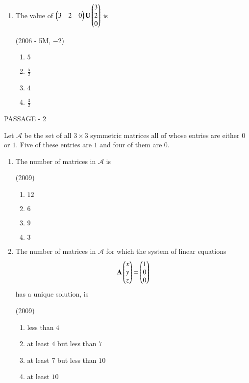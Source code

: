 \documentclass[journal,12pt,twocolumn]{IEEEtran}
\theoremstyle{remark}
\begin{document}
\begin{multicols}{2}
\begin{enumerate}
		\item The value of $\begin{pmatrix} 3 & 2 & 0 \end{pmatrix}
				\mathbf{U}
				\begin{pmatrix} 3 \\ 2 \\ 0 \end{pmatrix}$ is

			\hfill(2006 - 5M, $-2$)
			\begin{enumerate}
				\item $5$
				\item $\frac{5}{2}$
				\item $4$
				\item $\frac{3}{2}$
			\end{enumerate}
	\end{enumerate}

	\bigskip

	{\centering PASSAGE - 2 \par}

	\bigskip

	Let $\mathcal{A}$ be the set of all $3\times3$ symmetric matrices all of whose entries are either $0$ or $1$. Five of these entries are $1$ and four of them are $0$.

	\begin{enumerate}
		\item The number of matrices in $\mathcal{A}$ is

			\hfill(2009)

			\begin{enumerate}
				\item $12$
				\item $6$
				\item $9$
				\item $3$
			\end{enumerate}

		\pagebreak

		\item The number of matrices in $\mathcal{A}$ for which the system of linear equations
			$$\mathbf{A}\begin{pmatrix}x \\ y \\ z \end{pmatrix} = \begin{pmatrix} 1 \\ 0 \\ 0 \end{pmatrix}$$
			has a unique solution, is

			\hfill(2009)

			\begin{enumerate}
				\item less than $4$
				\item at least $4$ but less than $7$
				\item at least $7$ but less than $10$
				\item at least $10$
			\end{enumerate}


\end{enumerate}
\end{multicols}
\end{document}

